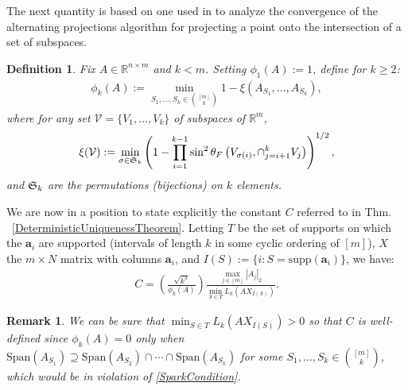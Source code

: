 \documentclass[journal, twocolumn]{IEEEtran}
\newtheorem{definition}{Definition}
\newtheorem{remark}{Remark}
\begin{document}
The next quantity is based on one used in \cite{Deutsch12} to analyze the convergence of the alternating projections algorithm for projecting a point onto the intersection of a set of subspaces.


\begin{definition}\label{SpecialSupportSet}
Fix $A \in \mathbb{R}^{n \times m}$ and $k < m$. Setting $\phi_1(A) := 1$, define for $k \geq 2$:
\begin{align*}
\phi_k(A) := \min_{ S_1,\ldots,S_k \in {[m] \choose k} } 1 - \xi( A_{S_1}, \ldots, A_{S_k}),
\end{align*}
where for any set $\mathcal{V} = \{V_1, \ldots, V_k\}$ of subspaces of $\mathbb{R}^m$, 
\begin{align*}
\xi(\mathcal{V}) := \min_{\sigma \in \frak{S}_k} \left(1 - \prod_{i=1}^{k-1} \sin^2  \theta_F \left(V_{\sigma(i)}, \cap_{j=i+1}^k V_j \right)  \right)^{1/2},
\end{align*}
and $\frak{S}_{k}$ are the permutations (bijections) on $k$ elements. 
\end{definition}

We are now in a position to state explicitly the constant $C$ referred to in Thm. ~\ref{DeterministicUniquenessTheorem}. Letting $T$ be the set of supports on which the $\mathbf{a}_i$ are supported (intervals of length $k$ in some cyclic ordering of $[m]$), $X$ the $m \times N$ matrix with columns $\mathbf{a}_i$, and $I(S) := \{i : S = \text{supp}(\mathbf{a}_i)\}$, we have:
\begin{align}\label{Cdef}
C = \left( \frac{ \sqrt{k^3}}{ \phi_k(A) } \right) \frac{\max_{j \in [m]} |A_j|_2}{\min_{S \in T} L_k(AX_{I(S)})}.
\end{align}

\begin{remark}\label{nonzero}
We can be sure that $\min_{S \in T} L_k(AX_{I(S)}) > 0$ so that $C$ is well-defined since $\phi_k(A) = 0$ only when $\text{Span}(A_{S_1}) \supseteq \text{Span}(A_{S_2}) \cap \cdots \cap \text{Span}(A_{S_k})$ for some $S_1, \ldots, S_k \in {[m] \choose k}$, which would be in violation of \eqref{SparkCondition}.
\end{remark}
\end{document}
